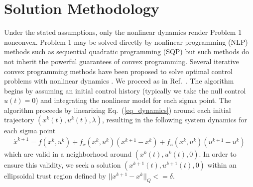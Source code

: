 \documentclass[10pt,a4paper]{article}
\begin{document}
	\section{Solution Methodology}
	Under the stated assumptions, only the nonlinear dynamics render Problem 1 nonconvex. Problem 1 may be solved directly by nonlinear programming (NLP) methods such as sequential quadratic programming (SQP) but such methods do not inherit the powerful guarantees of convex programming.
	Several iterative convex programming methods have been proposed to solve optimal control problems with nonlinear dynamics \cite{SeqConProg,SuccConvex1}. We proceed as in Ref.~\cite{SuccConvex1}. The algorithm begins by assuming an initial control history (typically we take the null control $u(t)=0$) and integrating the nonlinear model for each sigma point. The algorithm proceeds by linearizing Eq.~(\ref{eq_dynamics}) around each initial trajectory $ (x^k(t),u^k(t),\lambda) $, resulting in the following system dynamics for each sigma point
	\begin{align}
	\dot{x}^{k+1} = f(x^{k},u^k) + f_x(x^k,u^k)(x^{k+1}-x^k) + f_u(x^k,u^k)(u^{k+1}-u^k) \label{eq_linearized}
	\end{align}
	which are valid in a neighborhood around $ (x^k(t),u^k(t),0) $. In order to ensure this validity, we seek a solution $ (x^{k+1}(t),u^{k+1}(t),0) $ within an ellipsoidal trust region defined by $||x^{k+1}-x^k||_Q <= \delta$.
	
	
		
\end{document}
